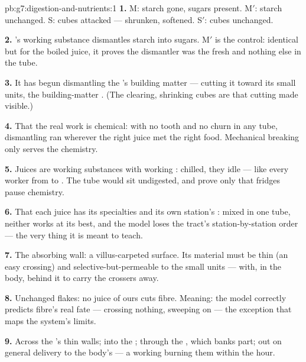 \begin{solution}{pb:g7:digestion-and-nutrients:1}
\textbf{1.} M: starch gone, sugars present. M$'$: starch
unchanged. S: cubes attacked --- shrunken, softened.
S$'$: cubes unchanged.

\textbf{2.} 's working substance dismantles starch
into sugars. M$'$ is the control: identical but for the
boiled juice, it proves the dismantler was the fresh
 and nothing else in the tube.

\textbf{3.} It has begun dismantling the 's building
matter --- cutting it toward its small units, the
building-matter . (The clearing, shrinking
cubes are that cutting made visible.)

\textbf{4.} That the real work is chemical: with no
tooth and no churn in any tube, dismantling ran wherever
the right juice met the right food. Mechanical breaking
only serves the chemistry.

\textbf{5.} Juices are working substances with working
: chilled, they idle --- like every worker
from  to . The tube would sit undigested,
and prove only that fridges pause chemistry.

\textbf{6.} That each juice has its specialties and its
own station's : mixed in one tube, neither
works at its best, and the model loses the tract's
station-by-station order --- the very thing it is meant
to teach.

\textbf{7.} The absorbing wall: a villus-carpeted
surface. Its material must be thin (an easy crossing)
and selective-but-permeable to the small units --- with,
in the body,  behind it to carry the
crossers away.

\textbf{8.} Unchanged flakes: no juice of ours cuts
fibre. Meaning: the model correctly predicts fibre's
real fate --- crossing nothing, sweeping on --- the
exception that maps the system's limits.

\textbf{9.} Across the 's thin walls; into the
; through the , which banks part; out on
general delivery to the body's  --- a working
 burning them within the hour.


\end{solution}

